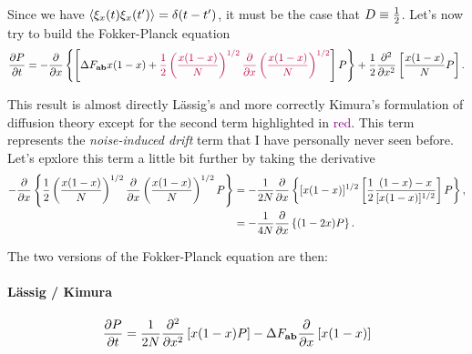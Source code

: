Since we have $\left\langle \xi_x(t) \xi_x(t') \right\rangle = \delta(t - t')$, it must be the
case that $D \equiv {1 \over 2}$. Let's now try to build the Fokker-Planck
equation
\begin{equation}
  {\partial P \over \partial t} = - {\partial \over \partial x}
  \left\{ \left[ \Delta F_{\mathbf{ab}} x (1 - x) +
  \textcolor{purple}{{1 \over 2} \left( {x (1 - x) \over N} \right)^{1/2}
  {\partial \over \partial x} \left( x (1 - x) \over N \right)^{1/2}}
  \right] P \right\} +
  {1 \over 2} {\partial^2 \over \partial x^2} \left[ {x (1 - x) \over N} P
  \right].
\end{equation}

This result is almost directly L\"{a}ssig's and more correctly Kimura's formulation
of diffusion theory except for the second term highlighted in
\textcolor{purple}{red}. This term represents the {\it noise-induced drift} term
that I have personally never seen before. Let's epxlore this term a little bit
further by taking the derivative
\begin{align}
  -{\partial \over \partial x} \left\{ {1 \over 2}
  \left( {x (1 - x) \over N} \right)^{1/2}
  {\partial \over \partial x} \left( {x (1 - x) \over N} \right)^{1/2} P
  \right\} &=
  - {1 \over 2 N} {\partial \over \partial x} \left\{ [x (1 - x)]^{1/2}
  \left[ {1 \over 2} {{(1 - x) - x} \over [x (1 - x)]^{1/2}} \right] P
  \right\},\\
  &= -{1 \over 4 N} {\partial \over \partial x}\left\{ (1 - 2 x) P \right\}.
\end{align}

The two versions of the Fokker-Planck equation are then:
\paragraph{L\"{a}ssig / Kimura}
\begin{equation}
  {\partial P \over \partial t} = {1 \over 2N}
  {\partial^2 \over \partial x^2} \left[ x (1 - x) P \right] -
  \Delta F_{\mathbf{ab}} {\partial \over \partial x} \left[ x (1 - x)  \right]
\end{equation}

